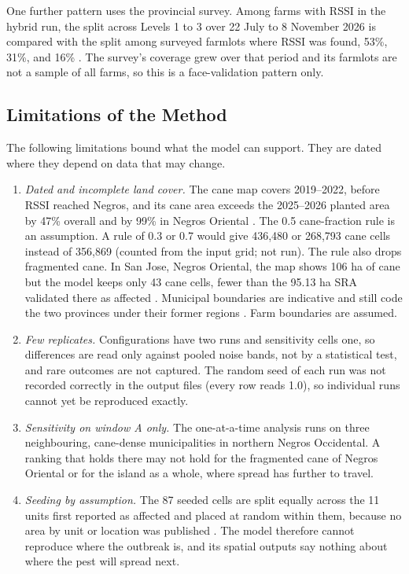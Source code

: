 One further pattern uses the provincial survey. Among farms with RSSI in the hybrid run, the split across Levels 1 to 3 over 22 July to 8 November 2026 is compared with the split among surveyed farmlots where RSSI was found, 53\%, 31\%, and 16\% \citep{PGNO2026}. The survey's coverage grew over that period and its farmlots are not a sample of all farms, so this is a face-validation pattern only.

\subsection{Limitations of the Method}

The following limitations bound what the model can support. They are dated where they depend on data that may change.

\begin{enumerate}
	\item \emph{Dated and incomplete land cover.} The cane map covers 2019--2022, before RSSI reached Negros, and its cane area exceeds the 2025--2026 planted area by 47\% overall and by 99\% in Negros Oriental \citep{DiTommaso2024,SRA2026FOI}. The 0.5 cane-fraction rule is an assumption. A rule of 0.3 or 0.7 would give 436,480 or 268,793 cane cells instead of 356,869 (counted from the input grid; not run). The rule also drops fragmented cane. In San Jose, Negros Oriental, the map shows 106 ha of cane but the model keeps only 43 cane cells, fewer than the 95.13 ha SRA validated there as affected \citep{SRA2026FOI}. Municipal boundaries are indicative and still code the two provinces under their former regions \citep{OCHA2025}. Farm boundaries are assumed.
	\item \emph{Few replicates.} Configurations have two runs and sensitivity cells one, so differences are read only against pooled noise bands, not by a statistical test, and rare outcomes are not captured. The random seed of each run was not recorded correctly in the output files (every row reads 1.0), so individual runs cannot yet be reproduced exactly.
	\item \emph{Sensitivity on window A only.} The one-at-a-time analysis runs on three neighbouring, cane-dense municipalities in northern Negros Occidental. A ranking that holds there may not hold for the fragmented cane of Negros Oriental or for the island as a whole, where spread has further to travel.
	\item \emph{Seeding by assumption.} The 87 seeded cells are split equally across the 11 units first reported as affected and placed at random within them, because no area by unit or location was published \citep{ManilaBulletin2025,Guadalquiver2025}. The model therefore cannot reproduce where the outbreak is, and its spatial outputs say nothing about where the pest will spread next.

\end{enumerate}
